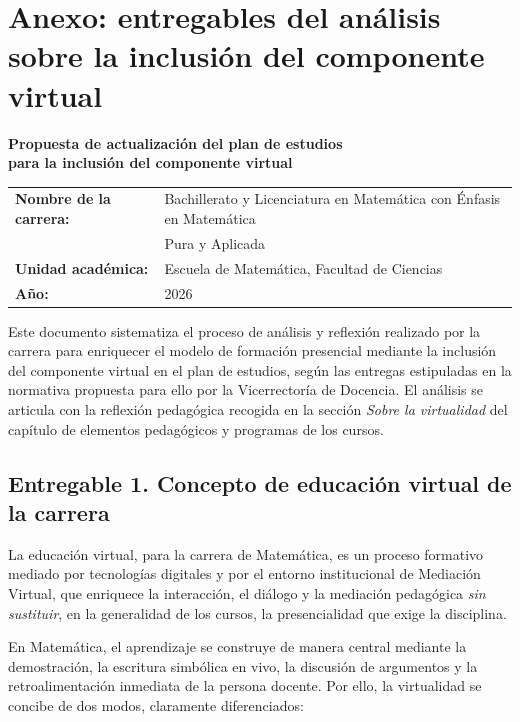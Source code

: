 \chapter{Anexo: entregables del análisis sobre la inclusión del componente virtual}
\label{sec:anexo-virtualidad}

\begin{center}
{\large\bfseries\color{Azul-UCR} Propuesta de actualización del plan de estudios}\\[4pt]
{\bfseries para la inclusión del componente virtual}\\[10pt]
\begin{tabular}{@{}ll@{}}
\textbf{Nombre de la carrera:} & Bachillerato y Licenciatura en Matemática con Énfasis en Matemática \\ & Pura y Aplicada \\
\textbf{Unidad académica:} & Escuela de Matemática, Facultad de Ciencias \\
\textbf{Año:} & 2026 \\
\end{tabular}
\end{center}

\vspace{8pt}

Este documento sistematiza el proceso de análisis y reflexión realizado por la carrera para enriquecer el modelo de formación presencial mediante la inclusión del componente virtual en el plan de estudios, según las entregas estipuladas en la normativa propuesta para ello por la Vicerrectoría de Docencia. El análisis se articula con la reflexión pedagógica recogida en la sección \emph{Sobre la virtualidad} del capítulo de elementos pedagógicos y programas de los cursos.

\section{Entregable 1. Concepto de educación virtual de la carrera}

La educación virtual, para la carrera de Matemática, es un proceso formativo mediado por tecnologías digitales y por el entorno institucional de Mediación Virtual, que enriquece la interacción, el diálogo y la mediación pedagógica \emph{sin sustituir}, en la generalidad de los cursos, la presencialidad que exige la disciplina.

En Matemática, el aprendizaje se construye de manera central mediante la demostración, la escritura simbólica en vivo, la discusión de argumentos y la retroalimentación inmediata de la persona docente. Por ello, la virtualidad se concibe de dos modos, claramente diferenciados:

